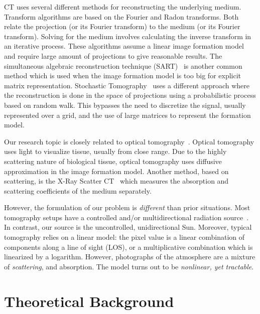 \documentclass[10pt,letterpaper]{article}
\begin{document}
CT uses several different methods for reconstructing the underlying
medium. Transform algorithms are based on the Fourier and Radon
transforms. Both relate the projection (or its Fourier transform) to
the medium (or its Fourier transform). Solving for the medium involves
calculating the inverse transform in an iterative process.  These
algorithms assume a linear image formation model and require large
amount of projections to give reasonable results. The simultaneous
algebraic reconstruction technique
(SART)~\cite{KakAvinashC.andSlaney2001} is another common method which
is used when the image formation model is too big for explicit matrix
representation. Stochastic Tomography~\cite{gregson} uses a different
approach where the reconstruction is done in the space of projections
using a probabilistic process based on random walk. This bypasses the
need to discretize the signal, usually represented over a grid, and
the use of large matrices to represent the formation model.

Our research topic is closely related to optical
tomography~\cite{Arridge}. Optical tomography uses light to visualize
tissue, usually from close range.  Due to the highly scattering nature
of biological tissue, optical tomography uses diffusive approximation
in the image formation model.  Another method, based on scattering, is
the X-Ray Scatter CT~\cite{Aviles2011} which measures the absorption
and scattering coefficients of the medium separately.

However, the formulation of our problem is {\em different} than prior
situations. Most tomography setups have a controlled and/or
multidirectional radiation source~\cite{messer}. In contrast, our
source is the uncontrolled, unidirectional Sun. Moreover, typical
tomography relies on a linear model: the pixel value is a linear
combination of components along a line of sight (LOS), or a
multiplicative combination which is linearized by a logarithm.
However, photographs of the atmosphere are a mixture of {\em
  scattering}, and absorption. The model turns out to be {\em
  nonlinear, yet tractable}.


\section{Theoretical Background}
\label{sec:theor-backgr}
\end{document}
